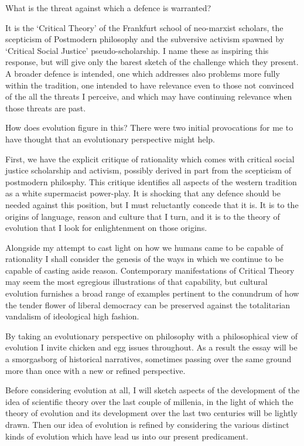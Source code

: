 \documentclass[10pt,titlepage]{book}
\begin{document}
What is the threat against which a defence is warranted?

It is the `Critical Theory' of the Frankfurt school of neo-marxist scholars, the scepticism of Postmodern philosophy and the subversive activism spawned by `Critical Social Justice' pseudo-scholarship.
I name these as inspiring this response, but will give only the barest sketch of the challenge which they present.
A broader defence is intended, one which addresses also problems more fully within the tradition, one intended to have relevance even to those not convinced of the all the threats I perceive, and which may have continuing relevance when those threats are past.

How does evolution figure in this?
There were two initial provocations for me to have thought that an evolutionary perspective might help.

First, we have the explicit critique of rationality which comes with critical social justice scholarship and activism, possibly derived in part from the scepticism of postmodern philosphy.
This critique identifies all aspects of the western tradition as a white supermacist power-play.
It is shocking that any defence should be needed against this position, but I must reluctantly concede that it is.
It is to the origins of language, reason and culture that I turn, and it is to the theory of evolution that I look for enlightenment on those origins.

Alongside my attempt to cast light on how we humans came to be capable of rationality I shall consider the genesis of the ways in which we continue to be capable of casting aside reason.
Contemporary manifestations of Critical Theory may seem the most egregious illustrations of that capability, but cultural evolution furnishes a broad range of examples pertinent to the conundrum of how the tender flower of liberal democracy can be preserved against the totalitarian vandalism of ideological high fashion.

By taking an evolutionary perspective on philosophy with a philosophical view of evolution I invite chicken and egg issues throughout.
As a result the essay will be a smorgasborg of historical narratives, sometimes passing over the same ground more than once with a new or refined perspective.

Before considering evolution at all, I will sketch aspects of the development of the idea of scientific theory over the last couple of millenia, in the light of which the theory of evolution and its development over the last two centuries will be lightly drawn.
Then our idea of evolution is refined by considering the various distinct kinds of evolution which have lead us into our present predicament.
\end{document}
